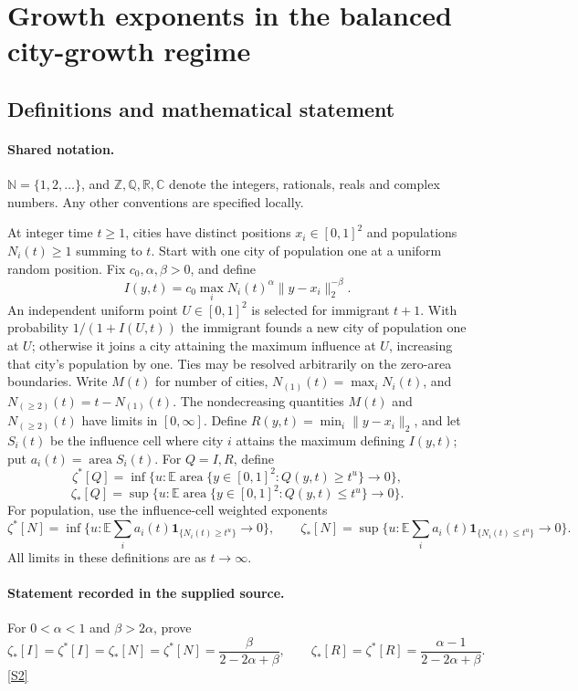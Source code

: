\documentclass[11pt]{article}
\newcommand{\sref}[2]{\hyperlink{source:#1:#2}{[S#2]}}
\begin{document}
\section{Growth exponents in the balanced city-growth regime}\label{statement}

\subsection{Definitions and mathematical statement}

\paragraph{Shared notation.}$\mathbb N=\{1,2,\ldots\}$, and $\mathbb Z,\mathbb Q,\mathbb R,\mathbb C$ denote the integers, rationals, reals and complex numbers. Any other conventions are specified locally.


At integer time $t\ge1$, cities have distinct positions $x_i\in[0,1]^2$ and populations $N_i(t)\ge1$ summing to $t$. Start with one city of population one at a uniform random position. Fix $c_0,\alpha,\beta>0$, and define
\[I(y,t)=c_0\max_i N_i(t)^\alpha\|y-x_i\|_2^{-\beta}.\]
An independent uniform point $U\in[0,1]^2$ is selected for immigrant $t+1$. With probability $1/(1+I(U,t))$ the immigrant founds a new city of population one at $U$; otherwise it joins a city attaining the maximum influence at $U$, increasing that city's population by one. Ties may be resolved arbitrarily on the zero-area boundaries. Write $M(t)$ for number of cities, $N_{(1)}(t)=\max_iN_i(t)$, and $N_{(\ge2)}(t)=t-N_{(1)}(t)$. The nondecreasing quantities $M(t)$ and $N_{(\ge2)}(t)$ have limits in $[0,\infty]$. Define $R(y,t)=\min_i\|y-x_i\|_2$, and let $S_i(t)$ be the influence cell where city $i$ attains the maximum defining $I(y,t)$; put $a_i(t)=\operatorname{area}S_i(t)$. For $Q=I,R$, define
\[\zeta^*[Q]=\inf\{u:\mathbb E\operatorname{area}\{y\in[0,1]^2:Q(y,t)\ge t^u\}\to0\},\]
\[\zeta_*[Q]=\sup\{u:\mathbb E\operatorname{area}\{y\in[0,1]^2:Q(y,t)\le t^u\}\to0\}.\]
For population, use the influence-cell weighted exponents
\[\zeta^*[N]=\inf\{u:\mathbb E\sum_i a_i(t)\mathbf1_{\{N_i(t)\ge t^u\}}\to0\},\qquad
\zeta_*[N]=\sup\{u:\mathbb E\sum_i a_i(t)\mathbf1_{\{N_i(t)\le t^u\}}\to0\}.\]
All limits in these definitions are as $t\to\infty$.
\paragraph{Statement recorded in the supplied source.}
For $0<\alpha<1$ and $\beta>2\alpha$, prove
\[\zeta_*[I]=\zeta^*[I]=\zeta_*[N]=\zeta^*[N]=\frac{\beta}{2-2\alpha+\beta},\qquad
\zeta_*[R]=\zeta^*[R]=\frac{\alpha-1}{2-2\alpha+\beta}.\] \sref{statement}{2}
\end{document}
